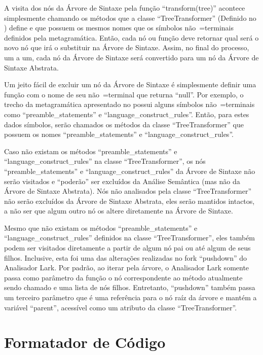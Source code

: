 A visita dos nós da Árvore de Sintaxe pela função ``transform(tree)'' acontece simplesmente chamando os métodos que a classe ``TreeTransformer'' (Definido no ) define e
que possuem os mesmos nomes que os símbolos não~=terminais definidos pela metagramática.
Então,
cada nó ou
função deve retornar qual será o novo nó que irá o substituir na Árvore de Sintaxe.
Assim,
no final do processo,
um a um,
cada nó da Árvore de Sintaxe será convertido para um nó da Árvore de Sintaxe Abstrata.

Um jeito fácil de excluir um nó da Árvore de Sintaxe é simplesmente definir uma função com o nome de seu não~=terminal que returna ``null''.
Por exemplo,
o trecho da metagramática apresentado no  possui alguns símbolos não~=terminais como ``preamble\_statements'' e
``language\_construct\_rules''. Então,
para estes dados símbolos,
serão chamados os métodos da classe ``TreeTransformer'' que possuem os nomes ``preamble\_statements'' e
``language\_construct\_rules''.

Caso não existam os métodos ``preamble\_statements'' e
``language\_construct\_rules'' na classe ``TreeTransformer'',
os nós ``preamble\_statements'' e
``language\_construct\_rules'' da Árvore de Sintaxe não serão visitados e
``poderão'' ser excluídos da Análise Semântica (mas não da Árvore de Sintaxe Abstrata).
Nós não analisados pela classe ``TreeTransformer'' não serão excluídos da Árvore de Sintaxe Abstrata,
eles serão mantidos intactos,
a não ser que algum outro nó os altere diretamente na Árvore de Sintaxe.

Mesmo que não existam os métodos ``preamble\_statements'' e
``language\_construct\_rules'' definidos na classe ``TreeTransformer'',
eles também podem ser visitados diretamente a partir de algum nó pai ou
até algum de seus filhos.
Inclusive,
esta foi uma das alterações realizadas no fork ``pushdown'' do Analisador Lark.
Por padrão,
ao iterar pela árvore,
o Analisador Lark somente passa como parâmetro da função o nó correspondente ao método atualmente sendo chamado e
uma lista de nós filhos.
Entretanto,
``pushdown'' também passa um terceiro parâmetro que é uma referência para o nó raíz da árvore e
mantém a variável ``parent'',
acessível como um atributo da classe ``TreeTransformer''.


\section{Formatador de Código}


